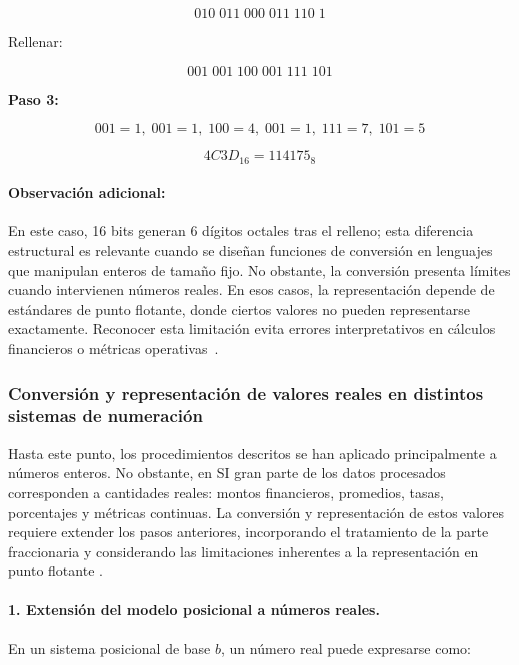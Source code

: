 \documentclass[12pt,twoside]{book}
\begin{document}
						\[
						010\;011\;000\;011\;110\;1
						\]
						
						\noindent
						Rellenar:
						
						\[
						001\;001\;100\;001\;111\;101
						\]
						
						\noindent
						\textbf{Paso 3:}
						
						\[
						001=1,\;001=1,\;100=4,\;001=1,\;111=7,\;101=5
						\]
						
						\[
						4C3D_{16} = 114175_8
						\]
						
						\noindent
						\paragraph{Observación adicional:} En este caso, 16 bits generan 6 dígitos octales tras el relleno; esta diferencia estructural es relevante cuando se diseñan funciones de conversión en lenguajes que manipulan enteros de tamaño fijo.
						No obstante, la conversión presenta límites cuando intervienen números reales. En esos casos, la representación depende de estándares de punto flotante, donde ciertos valores no pueden representarse exactamente. Reconocer esta limitación evita errores interpretativos en cálculos financieros o métricas operativas~\cite{Goldberg1991What,IEEE2019Standard754,Chapra2014Numerical}.
					
					\subsubsection{Conversión y representación de valores reales en distintos sistemas de numeración}
						\noindent	
						Hasta este punto, los procedimientos descritos se han aplicado principalmente a números enteros. No obstante, en SI gran parte de los datos procesados corresponden a cantidades reales: montos financieros, promedios, tasas, porcentajes y métricas continuas. La conversión y representación de estos valores requiere extender los pasos anteriores, incorporando el tratamiento de la parte fraccionaria y considerando las limitaciones inherentes a la representación en punto flotante \cite{Goldberg1991What,IEEE2019Standard754,Chapra2014Numerical}.
						
						\paragraph{1. Extensión del modelo posicional a números reales.} En un sistema posicional de base $b$, un número real puede expresarse como:
						
\end{document}
